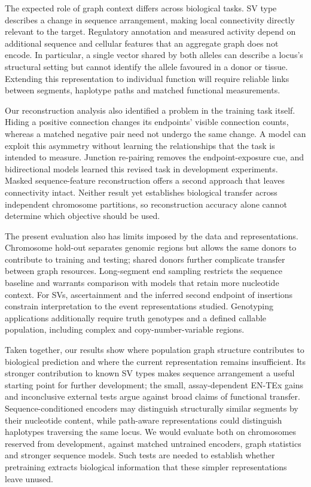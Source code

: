 \documentclass[11pt]{article}
\begin{document}
\begin{bibunit}[unsrtnat]
The expected role of graph context differs across biological tasks. SV type describes a change in sequence arrangement, making local connectivity directly relevant to the target. Regulatory annotation and measured activity depend on additional sequence and cellular features that an aggregate graph does not encode. In particular, a single vector shared by both alleles can describe a locus's structural setting but cannot identify the allele favoured in a donor or tissue. Extending this representation to individual function will require reliable links between segments, haplotype paths and matched functional measurements.

Our reconstruction analysis also identified a problem in the training task itself. Hiding a positive connection changes its endpoints' visible connection counts, whereas a matched negative pair need not undergo the same change. A model can exploit this asymmetry without learning the relationships that the task is intended to measure. Junction re-pairing removes the endpoint-exposure cue, and bidirectional models learned this revised task in development experiments. Masked sequence-feature reconstruction offers a second approach that leaves connectivity intact. Neither result yet establishes biological transfer across independent chromosome partitions, so reconstruction accuracy alone cannot determine which objective should be used.

The present evaluation also has limits imposed by the data and representations. Chromosome hold-out separates genomic regions but allows the same donors to contribute to training and testing; shared donors further complicate transfer between graph resources. Long-segment end sampling restricts the sequence baseline and warrants comparison with models that retain more nucleotide context. For SVs, ascertainment and the inferred second endpoint of insertions constrain interpretation to the event representations studied. Genotyping applications additionally require truth genotypes and a defined callable population, including complex and copy-number-variable regions.

Taken together, our results show where population graph structure contributes to biological prediction and where the current representation remains insufficient. Its stronger contribution to known SV types makes sequence arrangement a useful starting point for further development; the small, assay-dependent EN-TEx gains and inconclusive external tests argue against broad claims of functional transfer. Sequence-conditioned encoders may distinguish structurally similar segments by their nucleotide content, while path-aware representations could distinguish haplotypes traversing the same locus. We would evaluate both on chromosomes reserved from development, against matched untrained encoders, graph statistics and stronger sequence models. Such tests are needed to establish whether pretraining extracts biological information that these simpler representations leave unused.


\end{bibunit}
\end{document}
